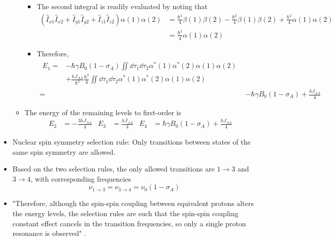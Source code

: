 \documentclass[../notes.tex]{subfiles}
\begin{document}
\begin{itemize}
\begin{itemize}
\begin{itemize}
            \item The second integral is readily evaluated by noting that
            \begin{align*}
                (\hat{I}_{x1}\hat{I}_{x2}+\hat{I}_{y1}\hat{I}_{y2}+\hat{I}_{z1}\hat{I}_{z2})\alpha(1)\alpha(2) &= \frac{\hbar^2}{4}\beta(1)\beta(2)-\frac{\hbar^2}{4}\beta(1)\beta(2)+\frac{\hbar^2}{4}\alpha(1)\alpha(2)\\
                &= \frac{\hbar^2}{4}\alpha(1)\alpha(2)
            \end{align*}
            \item Therefore,
            \begin{align*}
                \begin{split}
                    E_1 ={}& -\hbar\gamma B_0(1-\sigma_A)\iint\dd{\tau_1}\dd{\tau_2}\alpha^*(1)\alpha^*(2)\alpha(1)\alpha(2)\\
                    &+ \frac{hJ_{AA}}{\hbar^2}\frac{\hbar^2}{4}\iint\dd{\tau_1}\dd{\tau_2}\alpha^*(1)\alpha^*(2)\alpha(1)\alpha(2)
                \end{split}\\
                ={}& -\hbar\gamma B_0(1-\sigma_A)+\frac{hJ_{AA}}{4}
            \end{align*}
        \end{itemize}
        \item The energy of the remaining levels to first-order is
        \begin{align*}
            E_2 &= -\frac{3hJ_{AA}}{4}&
            E_3 &= \frac{hJ_{AA}}{4}&
            E_4 &= \hbar\gamma B_0(1-\sigma_A)+\frac{hJ_{AA}}{4}
        \end{align*}
    \end{itemize}
    \item Nuclear spin symmetry selection rule: Only transitions between states of the same spin symmetry are allowed.
    \item Based on the two selection rules, the only allowed transitions are $1\to 3$ and $3\to 4$, with corresponding frequencies
    \begin{equation*}
        \nu_{1\to 3} = \nu_{3\to 4} = \nu_0(1-\sigma_A)
    \end{equation*}
    \item "Therefore, although the spin-spin coupling between equivalent protons alters the energy levels, the selection rules are such that the spin-spin coupling constant effect cancels in the transition frequencies, so only a single proton resonance is observed" \parencite[573]{bib:McQuarrieSimon}.

\end{itemize}
\end{document}
